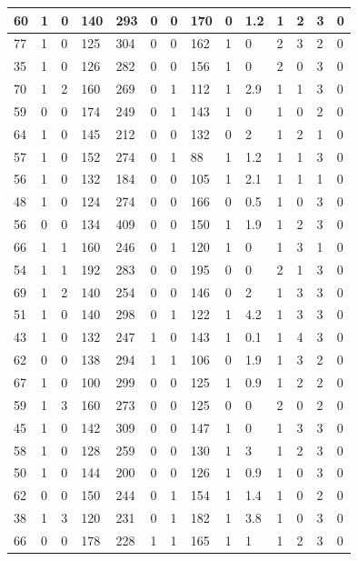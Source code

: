 \documentclass{article}
\begin{document}
\begin{table}[h!]
\begin{tabular}{|l|l|l|l|l|l|l|l|l|l|l|l|l|l|}
60 & 1 & 0 & 140 & 293 & 0 & 0 & 170 & 0 & 1.2 & 1  &2 & 3 & 0 \\ \hline
77 & 1 & 0 & 125 & 304 & 0 & 0 & 162 & 1 & 0 & 2  &3 & 2 & 0 \\ \hline
35 & 1 & 0 & 126 & 282 & 0 & 0 & 156 & 1 & 0 & 2  &0 & 3 & 0 \\ \hline
70 & 1 & 2 & 160 & 269 & 0 & 1 & 112 & 1 & 2.9 & 1  &1 & 3 & 0 \\ \hline
59 & 0 & 0 & 174 & 249 & 0 & 1 & 143 & 1 & 0 & 1  &0 & 2 & 0 \\ \hline
64 & 1 & 0 & 145 & 212 & 0 & 0 & 132 & 0 & 2 & 1  &2 & 1 & 0 \\ \hline
57 & 1 & 0 & 152 & 274 & 0 & 1 & 88 & 1 & 1.2 & 1  &1 & 3 & 0 \\ \hline
56 & 1 & 0 & 132 & 184 & 0 & 0 & 105 & 1 & 2.1 & 1  &1 & 1 & 0 \\ \hline
48 & 1 & 0 & 124 & 274 & 0 & 0 & 166 & 0 & 0.5 & 1  &0 & 3 & 0 \\ \hline
56 & 0 & 0 & 134 & 409 & 0 & 0 & 150 & 1 & 1.9 & 1  &2 & 3 & 0 \\ \hline
66 & 1 & 1 & 160 & 246 & 0 & 1 & 120 & 1 & 0 & 1  &3 & 1 & 0 \\ \hline
54 & 1 & 1 & 192 & 283 & 0 & 0 & 195 & 0 & 0 & 2  &1 & 3 & 0 \\ \hline
69 & 1 & 2 & 140 & 254 & 0 & 0 & 146 & 0 & 2 & 1  &3 & 3 & 0 \\ \hline
51 & 1 & 0 & 140 & 298 & 0 & 1 & 122 & 1 & 4.2 & 1  &3 & 3 & 0 \\ \hline
43 & 1 & 0 & 132 & 247 & 1 & 0 & 143 & 1 & 0.1 & 1  &4 & 3 & 0 \\ \hline
62 & 0 & 0 & 138 & 294 & 1 & 1 & 106 & 0 & 1.9 & 1  &3 & 2 & 0 \\ \hline
67 & 1 & 0 & 100 & 299 & 0 & 0 & 125 & 1 & 0.9 & 1  &2 & 2 & 0 \\ \hline
59 & 1 & 3 & 160 & 273 & 0 & 0 & 125 & 0 & 0 & 2  &0 & 2 & 0 \\ \hline
45 & 1 & 0 & 142 & 309 & 0 & 0 & 147 & 1 & 0 & 1  &3 & 3 & 0 \\ \hline
58 & 1 & 0 & 128 & 259 & 0 & 0 & 130 & 1 & 3 & 1  &2 & 3 & 0 \\ \hline
50 & 1 & 0 & 144 & 200 & 0 & 0 & 126 & 1 & 0.9 & 1  &0 & 3 & 0 \\ \hline
62 & 0 & 0 & 150 & 244 & 0 & 1 & 154 & 1 & 1.4 & 1  &0 & 2 & 0 \\ \hline
38 & 1 & 3 & 120 & 231 & 0 & 1 & 182 & 1 & 3.8 & 1  &0 & 3 & 0 \\ \hline
66 & 0 & 0 & 178 & 228 & 1 & 1 & 165 & 1 & 1 & 1  &2 & 3 & 0 \\ \hline

\end{tabular}
\end{table}
\end{document}
